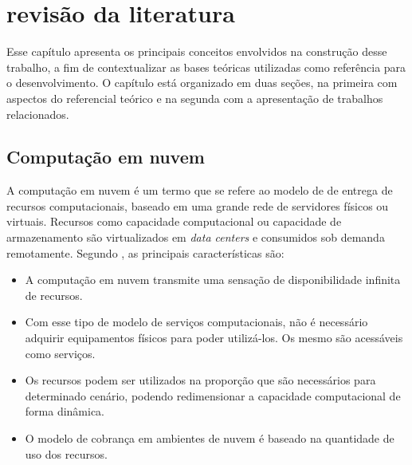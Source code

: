 \chapter{revis\~ao da literatura}
\label{cap:revisaoDaLiteratura}

Esse capítulo apresenta os principais conceitos envolvidos na construção desse trabalho, a fim de contextualizar as bases teóricas utilizadas como referência para o desenvolvimento. O capítulo está organizado em duas seções, na primeira com aspectos do referencial teórico e na segunda com a apresentação de trabalhos relacionados.

\section{Computa\c{c}\~ao em nuvem}
\label{sec:computacaoEmNuvem}

A computação em nuvem é um termo que se refere ao modelo de de entrega de recursos computacionais, baseado em uma grande rede de servidores físicos ou virtuais. Recursos como capacidade computacional ou capacidade de armazenamento são virtualizados em \textit{data centers} e consumidos sob demanda remotamente. Segundo \citet{taurioncloud}, as principais características são:

\begin{itemize}
    \item A computação em nuvem transmite uma sensação de disponibilidade infinita de recursos.

    \item Com esse tipo de modelo de serviços computacionais, não é necessário adquirir equipamentos físicos para poder utilizá-los. Os mesmo são acessáveis como serviços.

    \item Os recursos podem ser utilizados na proporção que são necessários para determinado cenário, podendo redimensionar a capacidade computacional de forma dinâmica.

    \item O modelo de cobrança em ambientes de nuvem é baseado na quantidade de uso dos recursos.
\end{itemize}

